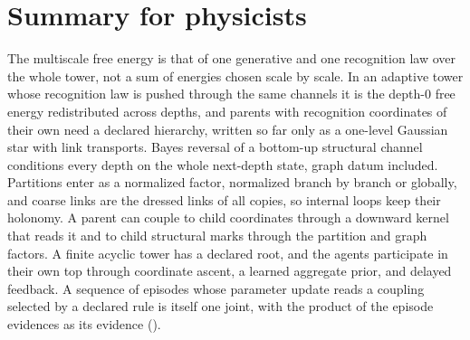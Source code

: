 \section*{Summary for physicists}

The multiscale free energy is that of one generative and one recognition law over the
whole tower, not a sum of energies chosen scale by scale. In an adaptive tower whose recognition law
is pushed through the same channels it is the depth-$0$ free energy redistributed across depths,
and parents with recognition coordinates of
their own need a declared hierarchy, written so far only as a one-level Gaussian star with link
transports. Bayes reversal of a
bottom-up structural channel conditions every depth on the whole next-depth state,
graph datum included. Partitions enter as a normalized factor, normalized branch by
branch or globally, and coarse links are the dressed links of all copies, so internal
loops keep their holonomy. A parent can couple to child coordinates through a downward kernel that
reads it and to child structural marks through the partition and graph factors. A finite acyclic tower has a declared root, and the agents
participate in their own top through coordinate ascent, a learned aggregate prior, and
delayed feedback. A sequence of episodes whose parameter update reads a coupling
selected by a declared rule is itself one joint, with the product of the episode
evidences as its evidence ().
